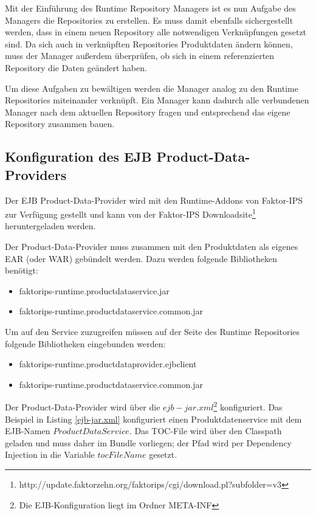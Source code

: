 \documentclass[headsepline=true, footsepline=true]{scrartcl}
\begin{document}
Mit der Einführung des Runtime Repository Managers ist es nun Aufgabe des
Managers die Repositories zu erstellen. Es muss damit ebenfalls sichergestellt
werden, dass in einem neuen Repository alle notwendigen Verknüpfungen gesetzt
sind. Da sich auch in verknüpften Repositories Produktdaten ändern können, muss
der Manager außerdem überprüfen, ob sich in einem referenzierten Repository die
Daten geändert haben.

Um diese Aufgaben zu bewältigen werden die Manager analog zu den Runtime
Repositories miteinander verknüpft. Ein Manager kann dadurch alle verbundenen
Manager nach dem aktuellen Repository fragen und entsprechend das eigene
Repository zusammen bauen.

\subsection{Konfiguration des EJB Product-Data-Providers}

Der EJB Product-Data-Provider wird mit den Runtime-Addons von Faktor-IPS zur Verfügung gestellt und
kann von der Faktor-IPS Downloadsite\footnote{http://update.faktorzehn.org/faktorips/cgi/download.pl?subfolder=v3} heruntergeladen werden.

Der Product-Data-Provider muss zusammen mit den Produktdaten als eigenes EAR (oder WAR) gebündelt werden.
Dazu werden folgende Bibliotheken benötigt:
\begin{itemize}
	\item faktorips-runtime.productdataservice.jar
	\item faktorips-runtime.productdataservice.common.jar
\end{itemize}

Um auf den Service zuzugreifen müssen auf der Seite des Runtime Repositories
folgende Bibliotheken eingebunden werden:

\begin{itemize}
	\item faktorips-runtime.productdataprovider.ejbclient
	\item faktorips-runtime.productdataservice.common.jar
\end{itemize}

Der Product-Data-Provider wird über die $ejb-jar.xml$\footnote{Die EJB-Konfiguration liegt im Ordner META-INF} konfiguriert. Das Beispiel in Listing \ref{ejb-jar.xml}
konfiguriert einen Produktdatenservice mit dem EJB-Namen $ProductDataService$. Das TOC-File wird über den Classpath geladen und muss daher im Bundle
vorliegen; der Pfad wird per Dependency Injection in die Variable $tocFileName$ gesetzt.
\end{document}
